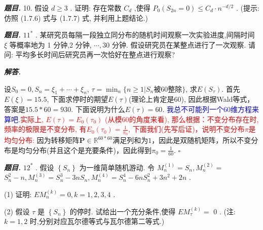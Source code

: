 \documentclass[10pt, a4paper, oneside]{ctexart}
\newenvironment{problem}{\begin{framed}\par\noindent\textbf{\textit{题目. }}}{\end{framed}\par}
\newenvironment{solution}{%
  \par\noindent\textbf{\textit{解答. }}\ignorespaces
}{%
  \hfill\ensuremath{\square}\par %
}
\begin{document}
\begin{problem}
    10. 假设 \( d \geq  3 \) . 证明: 存在常数 \( {C}_{d} \) ,使得 \( {P}_{0}\left( {{S}_{2n} = 0}\right)  \leq  {C}_{d} \cdot  {n}^{-d/2} \) . (提示: 仿照 (1.7.6) 式与 (1.7.7) 式, 并利用上题结论.)
\end{problem}

\begin{problem}
    \( {11}^{ * } \) . 某研究员每隔一段独立同分布的随机时间观察一次实验进度,间隔时间 \( \xi  \) 等概率地为 1 分钟,2 分钟, \( \cdots ,{30} \) 分钟. 假设研究员在某整点进行了一次观察. 请问: 平均多长时间后研究员再一次恰好在整点进行观察?
\end{problem}

\begin{solution}
    设$S_0=0,S_n=\xi_1+\cdots+\xi_n$, $\tau=\min_{n}\{n\geq 1|S_n\text{被60整除}\}$, 求$E(S_{\tau})$. 首先$E(\xi)=15.5$, 下面求停时的期望$E(\tau)$(理论上肯定是$60$), 因此根据Wald等式，答案是$15.5*60=930$. 下面说明为什么$E(\tau)=60$. \textcolor{blue}{我总不可能列一个$60$维方程来算吧}.\textcolor{red}{实际上, $E(\tau)=E_0(\tau_0)$ (从模$60$的角度来看), 那么根据：不变分布存在时, 频率的极限是不变分布, 有$E_0(\tau_0)=\frac{1}{\pi_0}$, 下面我们(先写后证)，说明不变分布$\pi$是均匀分布:} 因为转移矩阵$\mathbf{P}\in \mathbb{R}^{60*60}$满足列和为$1$，因此是双随机矩阵，所以不变分布是均匀分布(并且这个是充要条件)，因此得到$\pi_0=\frac{1}{60}$.
\end{solution}

\begin{problem}
    \( {12}^{ * } \) . 假设 \( \left\{  {S}_{n}\right\}   \) 为一维简单随机游动. 令 \( {M}_{n}^{\left( 1\right) } = {S}_{n},{M}_{n}^{\left( 2\right) } =  \) \( {S}_{n}^{2} - n,{M}_{n}^{\left( 3\right) } = {S}_{n}^{3} - {3n}{S}_{n},{M}_{n}^{\left( 4\right) } = {S}_{n}^{4} - {6n}{S}_{n}^{2} + 3{n}^{2} + {2n} \) .

(1) 证明: \( E{M}_{n}^{\left( k\right) } = 0,k = 1,2,3,4 \) .

(2) 假设 \( \tau  \) 是 \( \left\{  {S}_{n}\right\}   \) 的停时. 试给出一个充分条件,使得 \( E{M}_{\tau }^{\left( k\right) } =  \) 0 . (注: \( k = 1,2 \) 时,分别对应瓦尔德等式与瓦尔德第二等式.)
\end{problem}
\end{document}
